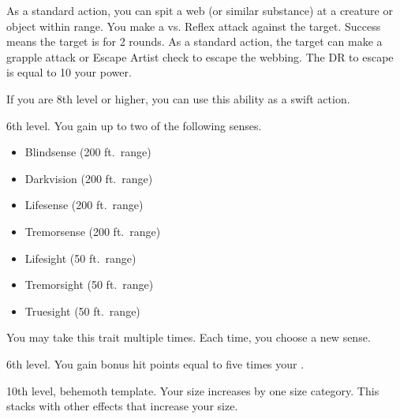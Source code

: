     \featben As a standard action, you can spit a web (or similar substance) at a creature or object within \rngmed range.
    You make a  vs. Reflex attack against the target.
    Success means the target is \immobilized for 2 rounds.
    As a standard action, the target can make a grapple attack or Escape Artist check to escape the webbing.
    The DR to escape is equal to 10 \add your power.

    If you are 8th level or higher, you can use this ability as a swift action.

    \featpre 6th level.
    \featben You gain up to two of the following senses.
    \begin{itemize}
        \item Blindsense (200 ft.\ range)
        \item Darkvision (200 ft.\ range)
        \item Lifesense (200 ft.\ range)
        \item Tremorsense (200 ft.\ range)
        \item Lifesight (50 ft.\ range)
        \item Tremorsight (50 ft.\ range)
        \item Truesight (50 ft.\ range)
    \end{itemize}
     You may take this trait multiple times.
    Each time, you choose a new sense.

    \featpre 6th level.
    \featben You gain bonus hit points equal to five times your .

    \featpre 10th level, behemoth template.
    \featben Your size increases by one size category.
    This stacks with other effects that increase your size.

